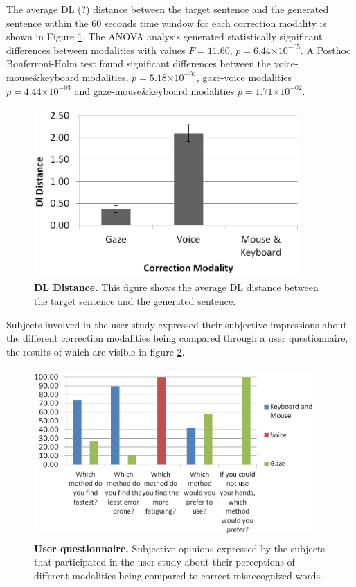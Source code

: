 \documentclass[]{article}
\providecommand{\e}[1]{\ensuremath{\times 10^{#1}}}
\begin{document}
The average DL (?) distance between the target sentence and the generated sentence within the 60 seconds time window for
each correction modality is shown in Figure \ref{dldistance}. The ANOVA analysis generated statistically
significant differences between modalities with values $F=11.60$, $p=6.44\e{-05}$. A Posthoc Bonferroni-Holm test found
significant differences between the voice-mouse\&keyboard modalities, $p=5.18\e{-04}$, gaze-voice modalities
$p=4.44\e{-03}$ and gaze-mouse\&keyboard modalities $p=1.71\e{-02}$. 

\begin{figure}[ht]
\begin{center}
\vspace{-3mm}
\includegraphics[width=0.9\textwidth,height=65mm]{figures/dldistance.png}
\end{center}
\caption{\textbf{DL Distance.} This figure shows the average DL distance between the target sentence and the generated
sentence.}
\label{dldistance}
\end{figure}


Subjects involved in the user study  expressed their subjective impressions about the different correction
modalities being compared through a user questionnaire, the results of which are visible in figure \ref{questionnaire}.

\begin{figure}[ht]
\begin{center}
\vspace{-3mm}
\includegraphics[width=0.95\textwidth,height=65mm]{figures/questionnaire.png}
\end{center}
\caption{\textbf{User questionnaire.} Subjective opinions expressed by the subjects that participated in the user
study about their perceptions of different modalities being compared to correct misrecognized words.}
\label{questionnaire}
\end{figure}
\end{document}
